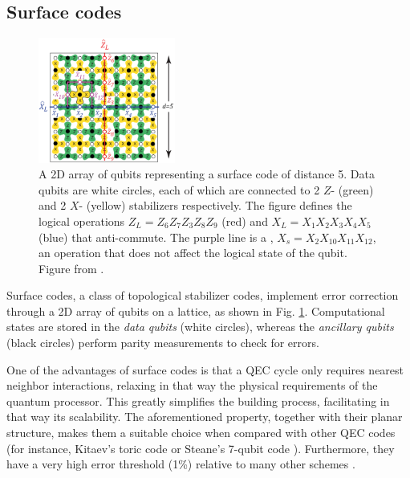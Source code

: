 \subsection{Surface codes}
\begin{figure}
  \centering
  \includegraphics[width=0.4\textwidth]{images/surface_code.png}
  \caption{A 2D array of qubits representing a surface code of distance 5. Data
    qubits are white circles, each of which are connected to 2 $Z$- (green)
    and 2 $X$- (yellow) stabilizers respectively. The figure defines the logical
    operations $Z_L = Z_6Z_7Z_3Z_8Z_9$ (red) and $X_L = X_1X_2X_3X_4X_5$ (blue)
    that anti-commute. The purple line is a ,
    $X_s = X_2 X_{10}X_{11} X_{12} $, an operation that does not affect the
    logical state of the qubit. Figure from \cite{fowler12_surfac_codes}.}
  \label{fig:surface_code}
\end{figure}

Surface codes, a class of topological stabilizer codes, implement error
correction through a 2D array of qubits on a lattice, as shown in Fig.
\ref{fig:surface_code}. Computational states are stored in the \textit{data
  qubits} (white circles), whereas the \textit{ancillary qubits} (black circles)
perform parity measurements to check for errors. 

One of the advantages of surface codes is that a QEC cycle only requires nearest
neighbor interactions, relaxing in that way the physical requirements of the
quantum processor. This greatly simplifies the building process, facilitating in
that way its scalability. %
The aforementioned property, together with their planar structure, makes them a
suitable choice when compared with other QEC codes (for instance, Kitaev's toric
code \cite{Kitaev_2003} or Steane's 7-qubit code \cite{Steane_1996_QEC}).
Furthermore, they have a very high error threshold (1\%) relative to many other
schemes \cite{terhal15}.



